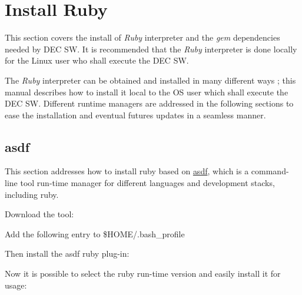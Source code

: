 \documentclass[dec_sum_main.tex]{subfiles}
\begin{document}
\section{Install Ruby}
 This section covers the install of \textit{Ruby} interpreter and the \textit{gem} dependencies needed by DEC SW. It is recommended that the \textit{Ruby} interpreter is done locally for the Linux user who shall execute the DEC SW.\newline

\par
\noindent 
The \textit{Ruby} interpreter can be obtained and installed in many different ways ; this manual describes how to install it local to the OS user which shall execute the DEC SW. Different runtime managers are addressed in the following sections to ease the installation and eventual futures updates in a seamless manner.

\subsection{asdf}
\par
\noindent
This section addresses how to install ruby based on \href{https://asdf-vm.com/guide/getting-started.html#_1-install-dependencies}{asdf}, which is a command-line tool run-time manager for different languages and development stacks, including ruby.\newline

\par
\noindent
Download the tool:

  \newline

Add the following entry to \$HOME/.bash\_profile 

  \newline


\par
\noindent
Then install the asdf ruby plug-in:

 \newline

\par
\noindent
Now it is possible to select the ruby run-time version and easily install it for usage:\newline

\end{document}
